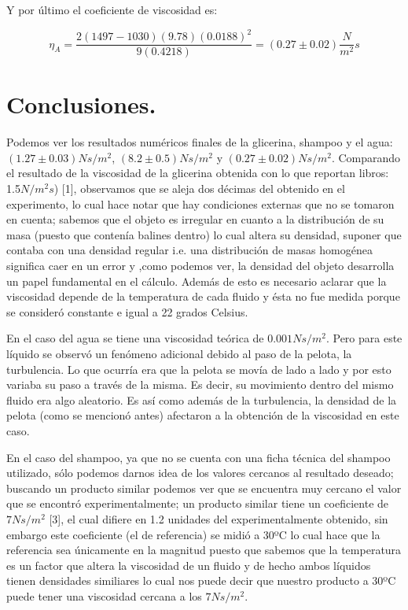 \documentclass[a4paper]{article}
\begin{document}
Y por último el coeficiente de viscosidad es:

\begin{equation}
    \eta_A = \frac{2(1497-1030)(9.78)(0.0188)^2}{9(0.4218)} = (0.27\pm0.02) \frac{N}{m^2}s
\end{equation}


\section*{Conclusiones.}
Podemos ver los resultados numéricos finales de la glicerina, shampoo y el agua: $(1.27\pm0.03) Ns/m^2$, $(8.2\pm0.5) Ns/m^2$ y $(0.27\pm0.02) Ns/m^2$. Comparando el resultado de la viscosidad de la glicerina  obtenida con lo que reportan libros: 1.5$N/m^2s$) [1], observamos que se aleja dos décimas del obtenido en el experimento, lo cual hace notar que hay condiciones externas que no se tomaron en cuenta; sabemos que el objeto es irregular en cuanto a la distribución de su masa (puesto que contenía balines dentro) lo cual altera su densidad, suponer que contaba con una densidad regular i.e. una distribución de masas homogénea significa caer en un error y ,como podemos ver, la densidad del objeto desarrolla un papel fundamental en el cálculo. Además de esto es necesario aclarar que la viscosidad depende de la temperatura de cada fluido y ésta no fue medida porque se consideró constante e igual a 22 grados Celsius. 

En el caso del agua se tiene una viscosidad teórica de $0.001 Ns/m^2$. Pero para este líquido se observó un fenómeno adicional debido al paso de la pelota, la turbulencia. Lo que ocurría era que la pelota se movía de lado a lado y por esto variaba su paso a través de la misma. Es decir, su movimiento dentro del mismo fluido era algo aleatorio. Es así como además de la turbulencia, la densidad de la pelota (como se mencionó antes) afectaron a la obtención de la viscosidad en este caso. 

En el caso del shampoo, ya que no se cuenta con una ficha técnica del shampoo utilizado, sólo podemos darnos idea de los valores cercanos al resultado deseado; buscando un producto similar podemos ver que se encuentra muy cercano el valor que se encontró experimentalmente; un producto similar tiene un coeficiente de $7 Ns/m^2$ [3], el cual difiere en 1.2 unidades del experimentalmente obtenido, sin embargo este coeficiente (el de referencia) se midió a 30ºC lo cual hace que la referencia sea únicamente en la magnitud puesto que sabemos que la temperatura es un factor que altera la viscosidad de un fluido y de hecho ambos líquidos tienen densidades similiares lo cual nos puede decir que nuestro producto a 30ºC puede tener una viscosidad cercana a los $7 Ns/m^2$.
\end{document}
